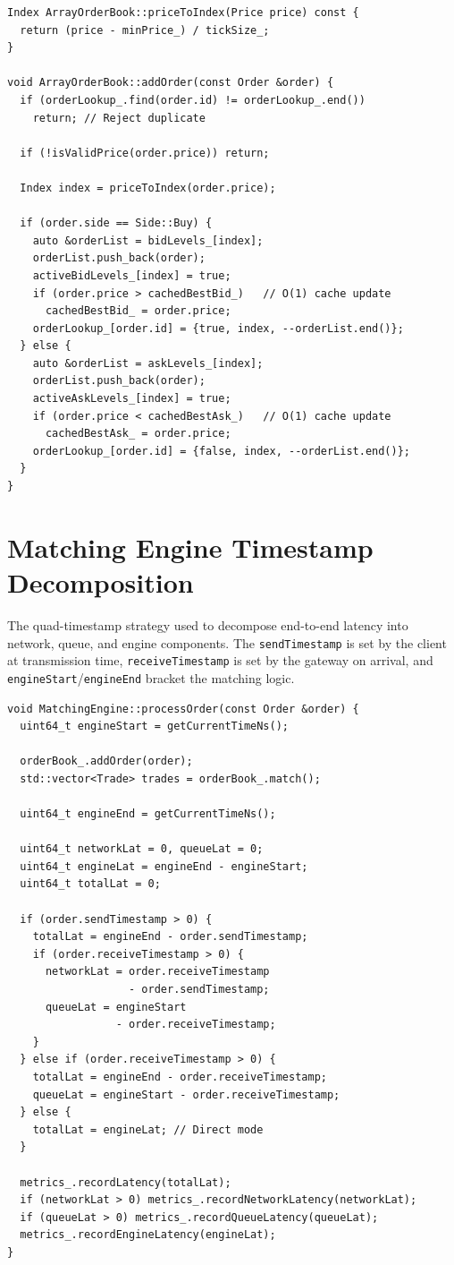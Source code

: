 \documentclass[12pt,a4paper]{report}
\begin{document}
\begin{lstlisting}[caption={ArrayOrderBook Insertion (src/orderbooks/array\_order\_book.cpp)}]
Index ArrayOrderBook::priceToIndex(Price price) const {
  return (price - minPrice_) / tickSize_;
}

void ArrayOrderBook::addOrder(const Order &order) {
  if (orderLookup_.find(order.id) != orderLookup_.end())
    return; // Reject duplicate

  if (!isValidPrice(order.price)) return;

  Index index = priceToIndex(order.price);

  if (order.side == Side::Buy) {
    auto &orderList = bidLevels_[index];
    orderList.push_back(order);
    activeBidLevels_[index] = true;
    if (order.price > cachedBestBid_)   // O(1) cache update
      cachedBestBid_ = order.price;
    orderLookup_[order.id] = {true, index, --orderList.end()};
  } else {
    auto &orderList = askLevels_[index];
    orderList.push_back(order);
    activeAskLevels_[index] = true;
    if (order.price < cachedBestAsk_)   // O(1) cache update
      cachedBestAsk_ = order.price;
    orderLookup_[order.id] = {false, index, --orderList.end()};
  }
}
\end{lstlisting}

\chapter{Matching Engine Timestamp Decomposition}
The quad-timestamp strategy used to decompose end-to-end latency into network, queue, and engine components. The \texttt{sendTimestamp} is set by the client at transmission time, \texttt{receiveTimestamp} is set by the gateway on arrival, and \texttt{engineStart}/\texttt{engineEnd} bracket the matching logic.

\begin{lstlisting}[caption={Latency Decomposition (src/core/matching\_engine.cpp)}]
void MatchingEngine::processOrder(const Order &order) {
  uint64_t engineStart = getCurrentTimeNs();

  orderBook_.addOrder(order);
  std::vector<Trade> trades = orderBook_.match();

  uint64_t engineEnd = getCurrentTimeNs();

  uint64_t networkLat = 0, queueLat = 0;
  uint64_t engineLat = engineEnd - engineStart;
  uint64_t totalLat = 0;

  if (order.sendTimestamp > 0) {
    totalLat = engineEnd - order.sendTimestamp;
    if (order.receiveTimestamp > 0) {
      networkLat = order.receiveTimestamp
                   - order.sendTimestamp;
      queueLat = engineStart
                 - order.receiveTimestamp;
    }
  } else if (order.receiveTimestamp > 0) {
    totalLat = engineEnd - order.receiveTimestamp;
    queueLat = engineStart - order.receiveTimestamp;
  } else {
    totalLat = engineLat; // Direct mode
  }

  metrics_.recordLatency(totalLat);
  if (networkLat > 0) metrics_.recordNetworkLatency(networkLat);
  if (queueLat > 0) metrics_.recordQueueLatency(queueLat);
  metrics_.recordEngineLatency(engineLat);
}
\end{lstlisting}
\end{document}
